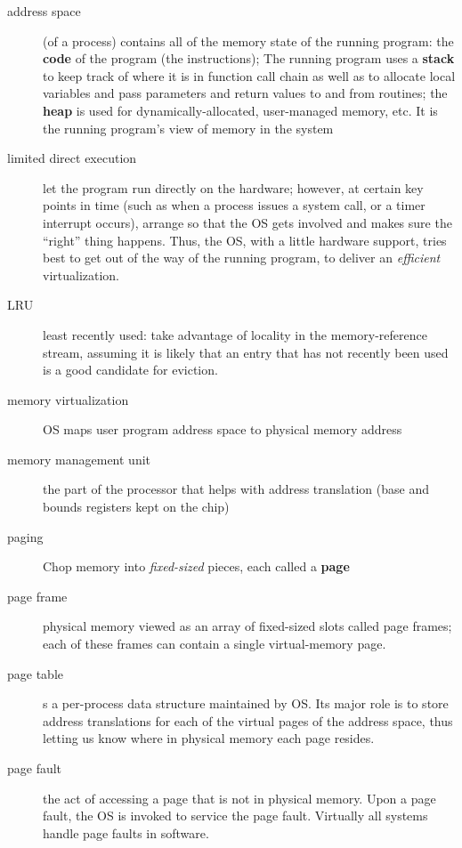 \begin{description}
\item[address space] (of a process) contains all of the memory state of the
running program: the \textbf{code} of the program (the instructions); The running program uses a \textbf{stack} to keep track of where it is in function call chain as well as to allocate local variables and pass parameters and return values to and from routines; the \textbf{heap} is used for dynamically-allocated, user-managed memory, etc.  It is the running program’s view of memory in the system

\item[limited direct execution] let the program run directly on the hardware; however, at certain key points in time (such as when a process issues a system call, or a timer interrupt occurs), arrange so that the OS gets involved and makes sure the “right” thing happens.   Thus, the OS, with a little hardware support, tries best to get out of the way of the running program, to deliver an \emph{efficient} virtualization.

\item[LRU] least recently used: take advantage of locality in the memory-reference stream, assuming it is likely that an entry that has not recently been used is a good
candidate for eviction.

\item[memory virtualization] OS maps user program address space to physical memory address

\item[memory management unit] the part of the processor that helps with address translation (base and bounds registers kept on the chip)

\item[paging] Chop memory into \emph{fixed-sized} pieces, each called a \textbf{page}

\item[page frame] physical memory viewed as an array of fixed-sized slots called page frames; each of these frames can contain a single virtual-memory page.

\item[page table] s a per-process data structure maintained by OS.  Its major role is to store address translations for each of the virtual pages of the address space, thus letting us know where in physical memory each page resides.

\item[page fault] the act of accessing a page that is not in physical memory.  Upon a page fault, the OS is invoked to service the page fault.  Virtually all systems handle page faults in software.


\end{description}
